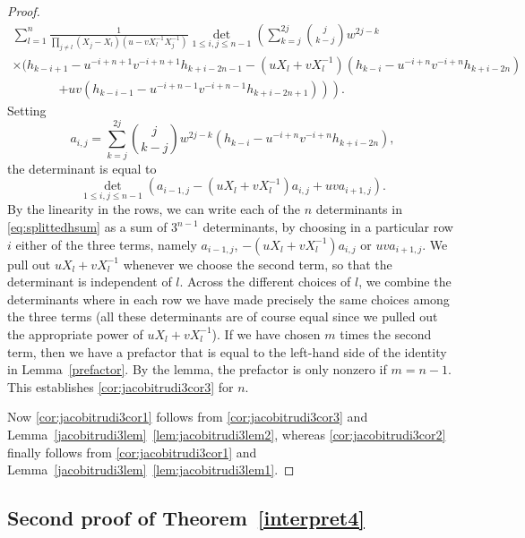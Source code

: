 \documentclass[12pt]{amsart}
\theoremstyle{definition}
\numberwithin{equation}{section}
\begin{document}
\begin{proof}
\begin{multline}
			\sum_{l=1}^n \frac{1}{\prod_{j \not= l} (X_j-X_l)(u-v X_l^{-1} X_j^{-1})} 
			\det_{1 \le i, j \le n-1} \left( \sum_{k=j}^{2j} \binom{j}{k-j} w^{2j-k} \right. \\
			\times ( h_{k-i+1} - u^{-i+n+1} v^{-i+n+1} h_{k+i-2n-1} 
			- (u X_l + v X_l^{-1}) (h_{k-i} - u^{-i+n} v^{-i+n} h_{k+i-2n})  \\
			\left. \phantom{\sum \binom{n}{k}} \left. + u v (h_{k-i-1} - u^{-i+n-1} v^{-i+n-1} h_{k+i-2n+1}) \right) \right).
		\end{multline} 
		Setting 
		\begin{equation*}
		a_{i,j} = \sum_{k=j}^{2j} \binom{j}{k-j} w^{2j-k} (h_{k-i} - u^{-i+n} v^{-i+n} h_{k+i-2n}),
		\end{equation*}
		the determinant is equal to
		\begin{equation*}
		\det_{1 \le i,j \le n-1} \left( a_{i-1,j} - (u X_l + v X_l^{-1}) a_{i,j} + u v a_{i+1,j} \right).
		\end{equation*}
		By the linearity in the rows, we can write each of the $n$ determinants in \eqref{eq:splittedhsum} as a sum of $3^{n-1}$ determinants, by choosing in a particular row $i$ either of the three terms, namely $a_{i-1,j}$, $-(u X_l + v X_l^{-1}) a_{i,j}$ or $u v a_{i+1,j}$. We pull out $u X_l + v X_l^{-1}$ whenever we choose the second term, so that the determinant is independent of $l$. Across the different choices of $l$, we combine the determinants where in each row we have made precisely the same choices among the three terms (all these determinants are of course equal since we pulled out the appropriate power of $u X_l + v X_l^{-1}$). If we have chosen $m$ times the second term, then we have a prefactor that is equal to the left-hand side of the identity in Lemma~\ref{prefactor}. By the lemma, the prefactor is only nonzero if $m=n-1$. This establishes \eqref{cor:jacobitrudi3cor3} for $n$.
		
		Now \eqref{cor:jacobitrudi3cor1} follows from \eqref{cor:jacobitrudi3cor3} and Lemma~\ref{jacobitrudi3lem}~\eqref{lem:jacobitrudi3lem2}, whereas \eqref{cor:jacobitrudi3cor2} finally follows from \eqref{cor:jacobitrudi3cor1} and Lemma~\ref{jacobitrudi3lem}~\eqref{lem:jacobitrudi3lem1}.
	\end{proof} 

\subsection{\texorpdfstring{Second proof of Theorem~\ref{interpret4}}{Second proof of Theorem 2.2}}
\label{sec:Prooffourthinterpretation}
\end{document}
